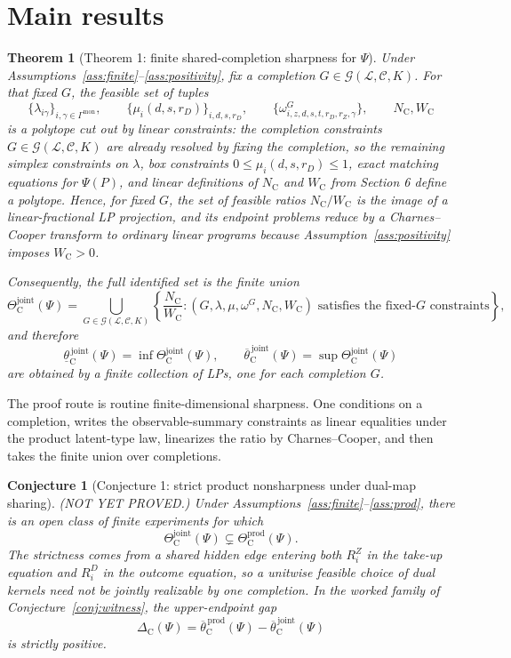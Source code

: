\documentclass[11pt]{article}
\newcommand{\calG}{\mathcal{G}}
\newcommand{\PsiObs}{\Psi}
\theoremstyle{definition}
\theoremstyle{plain}
\newtheorem{theorem}{Theorem}
\newtheorem{conjecture}{Conjecture}
\theoremstyle{remark}
\begin{document}
\section{Main results}
\begin{theorem}[Theorem 1: finite shared-completion sharpness for \(\PsiObs\)]\label{thm:sharp}
Under Assumptions~\ref{ass:finite}--\ref{ass:positivity}, fix a completion
\(G\in\calG(\mathcal L,\mathcal C,K)\). For that fixed \(G\), the feasible set
of tuples
\[
\{\lambda_{i\gamma}\}_{i,\gamma\in\Gamma^{\mathrm{mon}}},\qquad
\{\mu_i(d,s,r_D)\}_{i,d,s,r_D},\qquad
\{\omega^G_{i,z,d,s,t,r_D,r_Z,\gamma}\},\qquad
N_{\mathrm{C}},W_{\mathrm{C}}
\]
is a polytope cut out by linear constraints: the completion constraints
\(G\in\calG(\mathcal L,\mathcal C,K)\) are already resolved by fixing the
completion, so the remaining simplex constraints on \(\lambda\), box
constraints \(0\le \mu_i(d,s,r_D)\le 1\), exact matching equations for
\(\PsiObs(P)\), and linear definitions of \(N_{\mathrm{C}}\) and
\(W_{\mathrm{C}}\) from Section 6 define a polytope. Hence, for fixed \(G\), the set of feasible
ratios \(N_{\mathrm{C}}/W_{\mathrm{C}}\) is the image of a linear-fractional LP
projection, and its endpoint problems reduce by a Charnes--Cooper transform to
ordinary linear programs because Assumption~\ref{ass:positivity} imposes
\(W_{\mathrm{C}}>0\).

Consequently, the full identified set is the finite union
\[
\Theta_{\mathrm{C}}^{\mathrm{joint}}(\PsiObs)
=
\bigcup_{G\in\calG(\mathcal L,\mathcal C,K)}
\left\{
\frac{N_{\mathrm{C}}}{W_{\mathrm{C}}}:
(G,\lambda,\mu,\omega^G,N_{\mathrm{C}},W_{\mathrm{C}})
\text{ satisfies the fixed-}G\text{ constraints}
\right\},
\]
and therefore
\[
\underline{\theta}^{\,\mathrm{joint}}_{\mathrm{C}}(\PsiObs)
=
\inf \Theta_{\mathrm{C}}^{\mathrm{joint}}(\PsiObs),\qquad
\overline{\theta}^{\,\mathrm{joint}}_{\mathrm{C}}(\PsiObs)
=
\sup \Theta_{\mathrm{C}}^{\mathrm{joint}}(\PsiObs)
\]
are obtained by a finite collection of LPs, one for each completion \(G\).
\end{theorem}
The proof route is routine finite-dimensional sharpness. One conditions on a
completion, writes the observable-summary constraints as linear equalities
under the product latent-type law, linearizes the ratio by Charnes--Cooper, and
then takes the finite union over completions.

\begin{conjecture}[Conjecture 1: strict product nonsharpness under dual-map sharing]\label{conj:gap}
(NOT YET PROVED.) Under Assumptions~\ref{ass:finite}--\ref{ass:prod}, there is
an open class of finite experiments for which
\[
\Theta_{\mathrm{C}}^{\mathrm{joint}}(\PsiObs)
\subsetneq
\Theta_{\mathrm{C}}^{\mathrm{prod}}(\PsiObs).
\]
The strictness comes from a shared hidden edge entering both \(R_i^Z\) in the
take-up equation and \(R_i^D\) in the outcome equation, so a unitwise feasible
choice of dual kernels need not be jointly realizable by one completion. In
the worked family of Conjecture~\ref{conj:witness}, the upper-endpoint gap
\[
\Delta_{\mathrm{C}}(\PsiObs)
=
\overline{\theta}^{\,\mathrm{prod}}_{\mathrm{C}}(\PsiObs)
-
\overline{\theta}^{\,\mathrm{joint}}_{\mathrm{C}}(\PsiObs)
\]
is strictly positive.
\end{conjecture}
\end{document}
